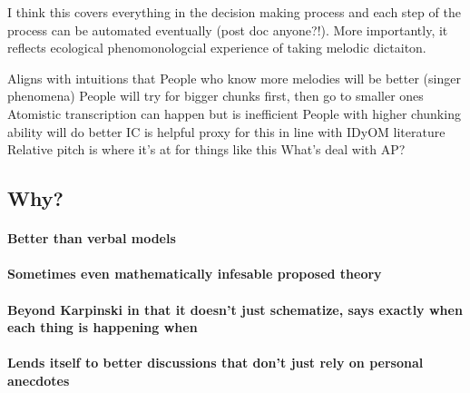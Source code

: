 \documentclass[]{book}
\let\oldparagraph\paragraph
\renewcommand{\paragraph}[1]{\oldparagraph{#1}\mbox{}}
\theoremstyle{definition}
\theoremstyle{definition}
\theoremstyle{definition}
\theoremstyle{remark}
\begin{document}
I think this covers everything in the decision making process and each
step of the process can be automated eventually (post doc anyone?!).
More importantly, it reflects ecological phenomonologcial experience of
taking melodic dictaiton.

Aligns with intuitions that People who know more melodies will be better
(singer phenomena) People will try for bigger chunks first, then go to
smaller ones Atomistic transcription can happen but is inefficient
People with higher chunking ability will do better IC is helpful proxy
for this in line with IDyOM literature Relative pitch is where it's at
for things like this What's deal with AP?

\hypertarget{why-2}{%
\subsection{Why?}\label{why-2}}

\hypertarget{better-than-verbal-models}{%
\paragraph{Better than verbal models}\label{better-than-verbal-models}}

\hypertarget{sometimes-even-mathematically-infesable-proposed-theory}{%
\paragraph{Sometimes even mathematically infesable proposed
theory}\label{sometimes-even-mathematically-infesable-proposed-theory}}

\hypertarget{beyond-karpinski-in-that-it-doesnt-just-schematize-says-exactly-when-each-thing-is-happening-when}{%
\paragraph{Beyond Karpinski in that it doesn't just schematize, says
exactly when each thing is happening
when}\label{beyond-karpinski-in-that-it-doesnt-just-schematize-says-exactly-when-each-thing-is-happening-when}}

\hypertarget{lends-itself-to-better-discussions-that-dont-just-rely-on-personal-anecdotes}{%
\paragraph{Lends itself to better discussions that don't just rely on
personal
anecdotes}\label{lends-itself-to-better-discussions-that-dont-just-rely-on-personal-anecdotes}}
\end{document}
